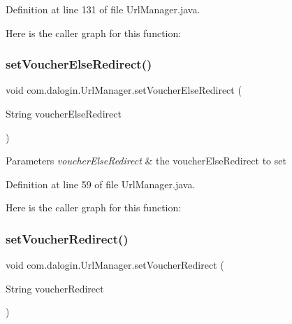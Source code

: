 Definition at line 131 of file Url\+Manager.\+java.

Here is the caller graph for this function\+:
\mbox{\label{classcom_1_1dalogin_1_1_url_manager_a47aeb698bb569a35a3299ef737c7e4da}} 
\subsubsection{\texorpdfstring{set\+Voucher\+Else\+Redirect()}{setVoucherElseRedirect()}}
{\footnotesize\ttfamily void com.\+dalogin.\+Url\+Manager.\+set\+Voucher\+Else\+Redirect (\begin{DoxyParamCaption}\item[{String}]{voucher\+Else\+Redirect }\end{DoxyParamCaption})}


\begin{DoxyParams}{Parameters}
{\em voucher\+Else\+Redirect} & the voucher\+Else\+Redirect to set \\
\hline
\end{DoxyParams}


Definition at line 59 of file Url\+Manager.\+java.

Here is the caller graph for this function\+:
\mbox{\label{classcom_1_1dalogin_1_1_url_manager_a1fb3ef89677add2b1ae7e4ea5e0f717d}} 
\subsubsection{\texorpdfstring{set\+Voucher\+Redirect()}{setVoucherRedirect()}}
{\footnotesize\ttfamily void com.\+dalogin.\+Url\+Manager.\+set\+Voucher\+Redirect (\begin{DoxyParamCaption}\item[{String}]{voucher\+Redirect }\end{DoxyParamCaption})}


